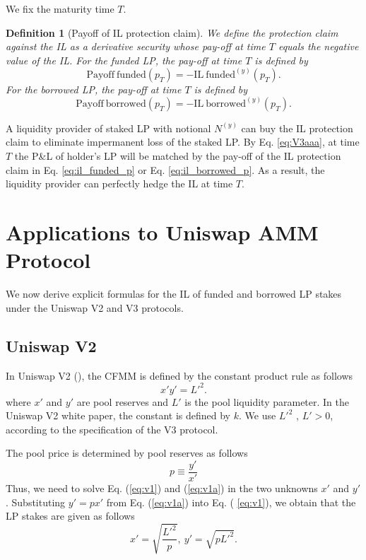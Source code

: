 \documentclass[pdftex,11pt,a4paper] {article}
\newtheorem{definition}{Definition}[section]
\begin{document}
We fix the maturity time $T$.

\begin{definition}[Payoff of IL protection claim]
We define the protection claim against the IL as a derivative security whose
pay-off at time $T$ equals the negative value of the IL. For the funded LP,
the pay-off at time $T$ is defined by
\begin{equation}
\mathrm{Payoff \ funded}(p_{T})=-\mathrm{IL \ funded}^{(y)}(p_{T}).  \label{eq:il_funded_p}
\end{equation}%
For the borrowed LP, the pay-off at time $T$ is defined by
\begin{equation}
\mathrm{Payoff \ borrowed}(p_{T})=-\mathrm{IL \ borrowed}^{(y)}(p_{T}).  \label{eq:il_borrowed_p}
\end{equation}
\end{definition}

A liquidity provider of staked LP with notional $N^{(y)}$ can buy the IL
protection claim to eliminate impermanent loss of the staked LP. By Eq. \eqref{eq:V3aaa}, at time $T$ the P\&L of holder's LP will be matched by the
pay-off of the IL protection claim in Eq. \eqref{eq:il_funded_p} or Eq. %
\eqref{eq:il_borrowed_p}. As a result, the liquidity provider can perfectly
hedge the IL at time $T$.

\section{Applications to Uniswap AMM Protocol}

\label{sec:apps}

We now derive explicit formulas for the IL of funded and borrowed LP stakes
under the Uniswap V2 and V3 protocols.

\subsection{Uniswap V2}

\label{sec:V2}

In Uniswap V2 (\cite{V2}), the CFMM is defined by the constant product rule
as follows
\begin{equation}  \label{eq:v1}
x' y' = L'^{2}.
\end{equation}
where $x'$ and $y'$ are pool reserves and $L'$ is the pool liquidity parameter.
In the Uniswap V2 white paper, the constant is defined by $k$. We use $L'^{2}$%
, $L'>0$, according to the specification of the V3 protocol.

The pool price is determined by pool reserves as follows
\begin{equation}  \label{eq:v1a}
p \equiv \frac{y'}{x'}
\end{equation}
Thus, we need to solve Eq. (\ref{eq:v1}) and (\ref{eq:v1a}) in the two
unknowns $x'$ and $y'$. Substituting $y'=p x'$ from Eq. (\ref{eq:v1a}) into Eq. (%
\ref{eq:v1}), we obtain that the LP stakes are given as follows
\begin{equation}  \label{eq:V2}
x' = \sqrt{\frac{L'^{2}}{p}} , \ y' = \sqrt{p L'^{2}}.
\end{equation}
\end{document}
